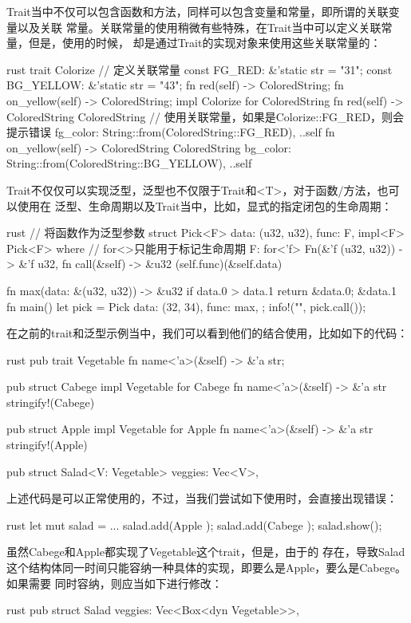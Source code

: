 Trait当中不仅可以包含函数和方法，同样可以包含变量和常量，即所谓的关联变量以及关联
常量。关联常量的使用稍微有些特殊，在Trait当中可以定义关联常量，但是，使用的时候，
却是通过Trait的实现对象来使用这些关联常量的：
\begin{code-block}{rust}
trait Colorize {
    // 定义关联常量
    const FG_RED: &'static str = "31";
    const BG_YELLOW: &'static str = "43";
    fn red(self) -> ColoredString;
    fn on_yellow(self) -> ColoredString;
}
impl Colorize for ColoredString {
    fn red(self) -> ColoredString {
        ColoredString {
            // 使用关联常量，如果是Colorize::FG_RED，则会提示错误
            fg_color: String::from(ColoredString::FG_RED),
            ..self
        }
    }
    fn on_yellow(self) -> ColoredString {
        ColoredString {
            bg_color: String::from(ColoredString::BG_YELLOW),
            ..self
        }
    }
}
\end{code-block}

Trait不仅仅可以实现泛型，泛型也不仅限于Trait和<T>，对于函数/方法，也可以使用在
泛型、生命周期以及Trait当中，比如，显式的指定闭包的生命周期：
\begin{code-block}{rust}
// 将函数作为泛型参数
struct Pick<F> {
    data: (u32, u32),
    func: F,
}
impl<F> Pick<F>
where
    // for<>只能用于标记生命周期
    F: for<'f> Fn(&'f (u32, u32)) -> &'f u32,
{
    fn call(&self) -> &u32 {
        (self.func)(&self.data)
    }
}

fn max(data: &(u32, u32)) -> &u32 {
    if data.0 > data.1 {
        return &data.0;
    }
    &data.1
}
fn main() {
    let pick = Pick {
        data: (32, 34),
        func: max,
    };
    info!("{}", pick.call());
}
\end{code-block}

在之前的trait和泛型示例当中，我们可以看到他们的结合使用，比如如下的代码：
\begin{code-block}{rust}
pub trait Vegetable {
    fn name<'a>(&self) -> &'a str;
}

pub struct Cabege {}
impl Vegetable for Cabege {
    fn name<'a>(&self) -> &'a str {
        stringify!(Cabege)
    }
}

pub struct Apple {}
impl Vegetable for Apple {
    fn name<'a>(&self) -> &'a str {
        stringify!(Apple)
    }
}

pub struct Salad<V: Vegetable> {
    veggies: Vec<V>,
}
\end{code-block}

上述代码是可以正常使用的，不过，当我们尝试如下使用时，会直接出现错误：
\begin{code-block}{rust}
let mut salad = ...
salad.add(Apple {});
salad.add(Cabege {});
salad.show();
\end{code-block}
虽然Cabege和Apple都实现了Vegetable这个trait，但是，由于的
存在，导致Salad这个结构体同一时间只能容纳一种具体的实现，即要么是Apple，要么是Cabege。如果需要
同时容纳，则应当如下进行修改：
\begin{code-block}{rust}
pub struct Salad{
    veggies: Vec<Box<dyn Vegetable>>,
}
\end{code-block}

